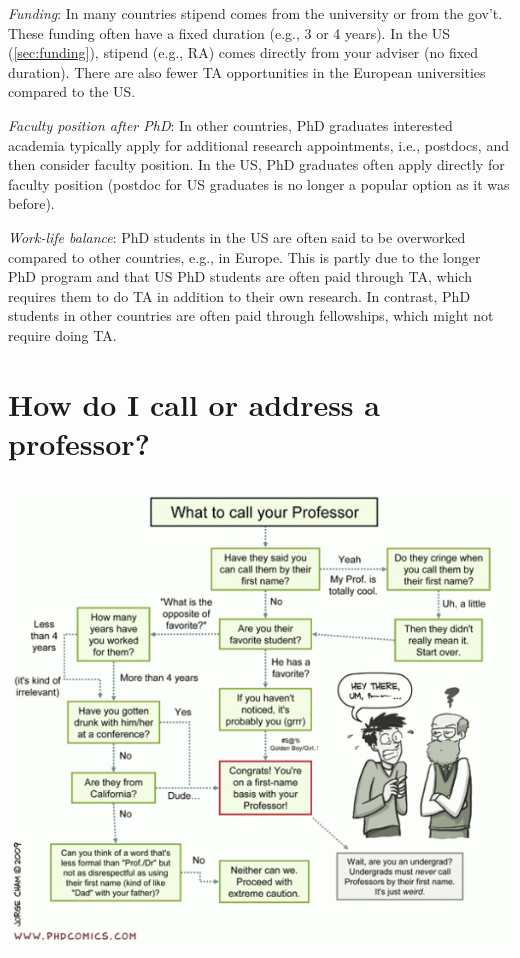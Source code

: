 \documentclass[oneside,11pt]{book}
\begin{document}
\emph{Funding}:  In many countries stipend comes from the university or from the gov't. These funding often have a fixed duration (e.g., 3 or 4 years).  In the US (\autoref{sec:funding}), stipend (e.g., RA) comes directly from your adviser (no fixed duration).  There are also fewer TA opportunities in the European universities compared to the US.

\emph{Faculty position after PhD}: In other countries, PhD graduates interested academia typically apply for additional research appointments, i.e., postdocs, and then consider faculty position. In the US, PhD graduates often apply directly for faculty position (postdoc for US graduates is no longer a popular option as it was before).  %

\emph{Work-life balance}: PhD students in the US are often said to be overworked compared to other countries, e.g., in Europe.  This is partly due to the longer PhD program and that US PhD students are often paid through TA, which requires them to do TA in addition to their own research. In contrast, PhD students in other countries are often paid through fellowships, which might not require doing TA.



\section{How do I call or address a professor?}\label{sec:address}

\begin{center}
  \includegraphics[scale=0.5]{files/c5.png}
\end{center}
\end{document}

